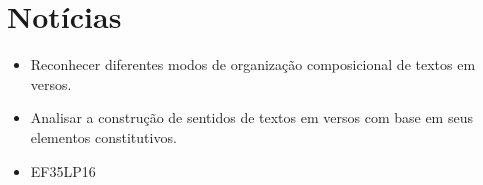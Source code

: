 \chapter{Notícias}



\begin{itemize}
  \item Reconhecer diferentes modos de organização composicional de textos em versos.

  \item Analisar a construção de sentidos de textos em versos com base em seus elementos constitutivos.
\end{itemize}



\begin{itemize}
	\item 
 EF35LP16
\end{itemize}

